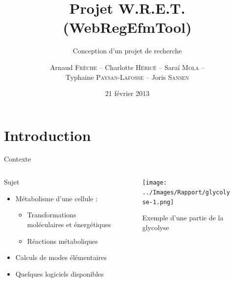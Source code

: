 \documentclass{beamer}
\title{\textcolor{bleu2}{\textbf{Projet W.R.E.T. (WebRegEfmTool)}}}
\subtitle{\textcolor{bleu1}{Conception d'un projet de recherche}}
\author[]{Arnaud \textsc{Frèche} -- Charlotte \textsc{Héricé} -- Saraï \textsc{Mola} -- \\ Typhaine \textsc{Paysan-Lafosse} -- Joris \textsc{Sansen}}
\institute{Master 2 BioInformatique}
\date{21 février 2013}
\begin{document}
\frame{\titlepage}


\section*{Introduction}

\begin{frame}{\textcolor{bleu2}{\hspace{1cm}Contexte}}
	\begin{columns}
		\begin{column}{7cm}
			\begin{block}{\hspace{0.4cm}Sujet}
				\begin{itemize}
					\item Métabolisme d'une cellule : 
					\begin{itemize}
						\item Transformations moléculaires et énergétiques
						\item Réactions métaboliques
					\end{itemize}
					\item Calculs de modes élémentaires
					\item Quelques logiciels disponibles
				\end{itemize}
			\end{block}
		\end{column}	
		\begin{column}{3.5cm}
			\begin{figure}
				\texttt{[image: ../Images/Rapport/glycolyse-1.png]}
				\caption{Exemple d'une partie de la glycolyse}
			\end{figure}
		\end{column}
	\end{columns}
\end{frame}
\end{document}
